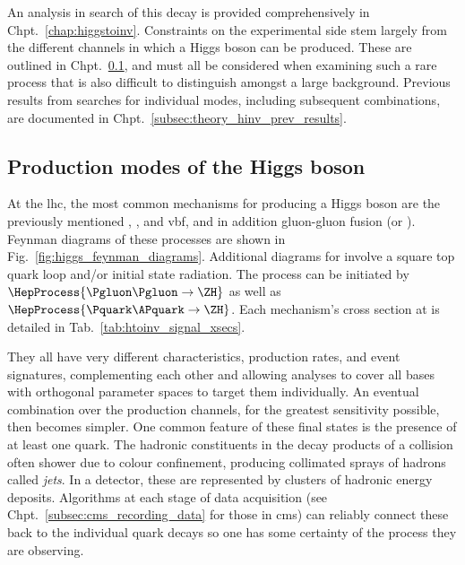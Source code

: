 
An analysis in search of this decay is provided comprehensively in Chpt.~\ref{chap:higgstoinv}. Constraints on the experimental side stem largely from the different channels in which a Higgs boson can be produced. These are outlined in Chpt.~\ref{subsec:theory_higgs_production_modes}, and must all be considered when examining such a rare process that is also difficult to distinguish amongst a large background. Previous results from searches for individual modes, including subsequent combinations, are documented in Chpt.~\ref{subsec:theory_hinv_prev_results}.




\subsection{Production modes of the Higgs boson}
\label{subsec:theory_higgs_production_modes}

At the \acrshort{lhc}, the most common mechanisms for producing a Higgs boson are the previously mentioned \ttH, \VH, and \acrshort{vbf}, and in addition gluon-gluon fusion (\ggF or \ggH). Feynman diagrams of these processes are shown in Fig.~\ref{fig:higgs_feynman_diagrams}. Additional diagrams for \ggH involve a square top quark loop and/or initial state radiation. The \ZH process can be initiated by $\HepProcess{\Pgluon\Pgluon\to \ZH}$ as well as $\HepProcess{\Pquark\APquark \to \ZH}$. Each mechanism's cross section at \comruntwo is detailed in Tab.~\ref{tab:htoinv_signal_xsecs}.

They all have very different characteristics, production rates, and event signatures, complementing each other and allowing analyses to cover all bases with orthogonal parameter spaces to target them individually. An eventual combination over the production channels, for the greatest sensitivity possible, then becomes simpler. One common feature of these final states is the presence of at least one quark. The hadronic constituents in the decay products of a collision often shower due to colour confinement, producing collimated sprays of hadrons called \emph{\glspl{jet}}. In a detector, these are represented by clusters of hadronic energy deposits. Algorithms at each stage of data acquisition (see Chpt.~\ref{subsec:cms_recording_data} for those in \acrshort{cms}) can reliably connect these back to the individual quark decays so one has some certainty of the process they are observing.

